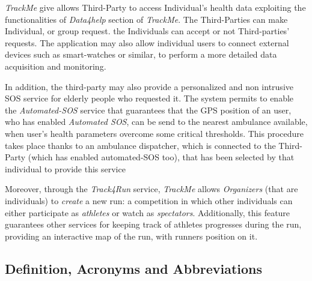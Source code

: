 \documentclass[a4paper]{article}
\begin{document}
   
   \textit{TrackMe} give allows Third-Party to access Individual's health data exploiting the functionalities of \textit{Data4help} section of \textit{TrackMe}. The Third-Parties can make Individual, or group request. the Individuals  can accept or not Third-parties' requests. The application may also allow individual users to connect external  devices such as smart-watches or similar, to perform a more detailed data acquisition and monitoring. 
   \newline
   
   
   In addition, the third-party may also provide a personalized and non intrusive SOS service for elderly people who requested it.
   The system permits to enable the \textit{Automated-SOS} service that guarantees that the GPS position of an user, who has enabled \textit{Automated SOS}, can be send to the nearest ambulance available, when user's health parameters overcome some critical thresholds. This procedure takes place thanks to an ambulance dispatcher, which is connected to the Third-Party (which has enabled automated-SOS too), that has been selected by that individual to provide this service
   \newline
   
   
   Moreover,  through  the \textit{Track4Run} service, \textit{TrackMe} allows \textit{Organizers} (that are individuals)  to  \textit{create}  a  new  run:  a  competition  in  which other individuals can either participate as \textit{athletes} or watch as \textit{spectators}.  Additionally, this feature guarantees other services for keeping track of athletes progresses during the run, providing an interactive map of the run, with runners position on it.
   
   




\newpage


\subsection{Definition, Acronyms and  Abbreviations}
           
\end{document}
